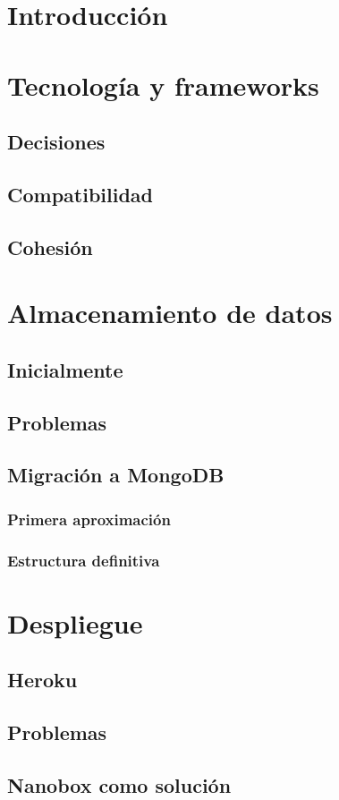 
\section{Introducción}

\section{Tecnología y frameworks}

\subsection{Decisiones}

\subsection{Compatibilidad}

\subsection{Cohesión}

\section{Almacenamiento de datos}

\subsection{Inicialmente}

\subsection{Problemas}

\subsection{Migración a MongoDB}

\subsubsection{Primera aproximación}

\subsubsection{Estructura definitiva}

\section{Despliegue}

\subsection{Heroku}

\subsection{Problemas}

\subsection{Nanobox como solución}